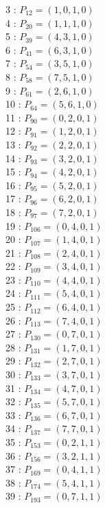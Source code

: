 \documentclass{article}
\begin{document}
{\begin{multicols}{3}
3 : $P_{12}=( 1, 0, 1, 0 )$\\
4 : $P_{20}=( 1, 1, 1, 0 )$\\
5 : $P_{39}=( 4, 3, 1, 0 )$\\
6 : $P_{41}=( 6, 3, 1, 0 )$\\
7 : $P_{54}=( 3, 5, 1, 0 )$\\
8 : $P_{58}=( 7, 5, 1, 0 )$\\
9 : $P_{61}=( 2, 6, 1, 0 )$\\
10 : $P_{64}=( 5, 6, 1, 0 )$\\
11 : $P_{90}=( 0, 2, 0, 1 )$\\
12 : $P_{91}=( 1, 2, 0, 1 )$\\
13 : $P_{92}=( 2, 2, 0, 1 )$\\
14 : $P_{93}=( 3, 2, 0, 1 )$\\
15 : $P_{94}=( 4, 2, 0, 1 )$\\
16 : $P_{95}=( 5, 2, 0, 1 )$\\
17 : $P_{96}=( 6, 2, 0, 1 )$\\
18 : $P_{97}=( 7, 2, 0, 1 )$\\
19 : $P_{106}=( 0, 4, 0, 1 )$\\
20 : $P_{107}=( 1, 4, 0, 1 )$\\
21 : $P_{108}=( 2, 4, 0, 1 )$\\
22 : $P_{109}=( 3, 4, 0, 1 )$\\
23 : $P_{110}=( 4, 4, 0, 1 )$\\
24 : $P_{111}=( 5, 4, 0, 1 )$\\
25 : $P_{112}=( 6, 4, 0, 1 )$\\
26 : $P_{113}=( 7, 4, 0, 1 )$\\
27 : $P_{130}=( 0, 7, 0, 1 )$\\
28 : $P_{131}=( 1, 7, 0, 1 )$\\
29 : $P_{132}=( 2, 7, 0, 1 )$\\
30 : $P_{133}=( 3, 7, 0, 1 )$\\
31 : $P_{134}=( 4, 7, 0, 1 )$\\
32 : $P_{135}=( 5, 7, 0, 1 )$\\
33 : $P_{136}=( 6, 7, 0, 1 )$\\
34 : $P_{137}=( 7, 7, 0, 1 )$\\
35 : $P_{153}=( 0, 2, 1, 1 )$\\
36 : $P_{156}=( 3, 2, 1, 1 )$\\
37 : $P_{169}=( 0, 4, 1, 1 )$\\
38 : $P_{174}=( 5, 4, 1, 1 )$\\
39 : $P_{193}=( 0, 7, 1, 1 )$\\

\end{multicols}}
\end{document}
